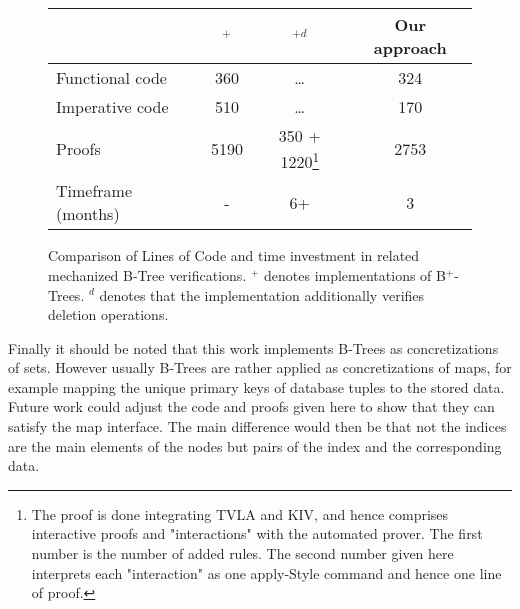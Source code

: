 \begin{figure}
    \centering
    \begin{tabular}{l|c|c|c}
        \                & \parencite{DBLP:conf/popl/MalechaMSW10}$^{+}$ & \parencite{DBLP:journals/sosym/ErnstSR15}$^{+d}$ & Our approach \\
        \hline
        Functional code &   360      & \dots                 & 324  \\
        Imperative code &   510      & \dots                 & 170  \\
        Proofs          &  5190      & 350 + 1220\footnote{
            The proof is done integrating TVLA and KIV, and hence comprises
            interactive proofs and "interactions" with the automated prover.
            The first number is the number of added rules.
            The second number given here interprets each "interaction" as one apply-Style
            command and hence one line of proof.
        } & 2753 \\
        Timeframe (months) &  -     & 6+                      & 3   \\
    \end{tabular}
    \caption{Comparison of Lines of Code and time investment in related mechanized B-Tree verifications.
    $^+$ denotes implementations of B$^+$-Trees.
    $^d$ denotes that the implementation additionally verifies deletion operations.
    }
    \label{fig:proof-comparison}
\end{figure}

Finally it should be noted that this work implements B-Trees as
concretizations of sets.
However usually B-Trees are rather applied as concretizations
of maps, for example mapping the unique primary keys
of database tuples to the stored data.
Future work could adjust the code and proofs given here
to show that they can satisfy the map interface.
The main difference would then be that not the indices
are the main elements of the nodes but pairs of the 
index and the corresponding data.
